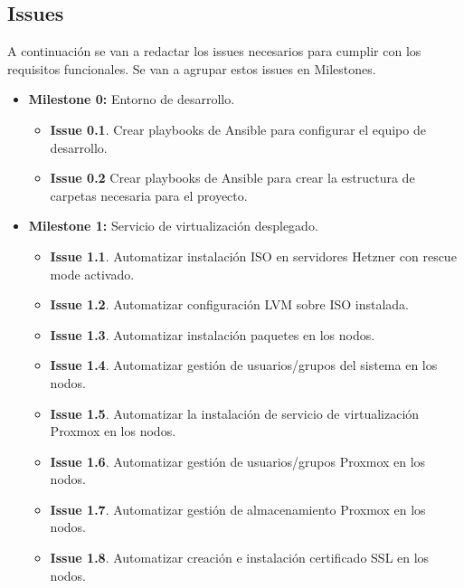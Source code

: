         \subsection{Issues}
        \begin{text}
                A continuación se van a redactar los issues necesarios para cumplir con los requisitos funcionales. Se van a agrupar estos issues en Milestones.

                \begin{itemize}
                        \item \textbf{Milestone 0:} Entorno de desarrollo. 
                                \begin{itemize}
                                        \item \textbf{Issue 0.1}. Crear playbooks de Ansible para configurar el equipo de desarrollo.
                                        \item \textbf{Issue 0.2} Crear playbooks de Ansible para crear la estructura de carpetas necesaria para el proyecto.
                                \end{itemize}
                        \item \textbf{Milestone 1:} Servicio de virtualización desplegado. 
                                \begin{itemize}
                                        \item \textbf{Issue 1.1}. Automatizar instalación ISO en servidores Hetzner con rescue mode activado.
                                        \item \textbf{Issue 1.2}. Automatizar configuración LVM sobre ISO instalada.
                                        \item \textbf{Issue 1.3}. Automatizar instalación paquetes en los nodos.
                                        \item \textbf{Issue 1.4}. Automatizar gestión de usuarios/grupos del sistema en los nodos.
                                        \item \textbf{Issue 1.5}. Automatizar la instalación de servicio de virtualización Proxmox en los nodos.
                                        \item \textbf{Issue 1.6}. Automatizar gestión de usuarios/grupos Proxmox en los nodos.
                                        \item \textbf{Issue 1.7}. Automatizar gestión de almacenamiento Proxmox en los nodos.
                                        \item \textbf{Issue 1.8}. Automatizar creación e instalación certificado SSL en los nodos.

\end{itemize}
\end{itemize}
\end{text}
